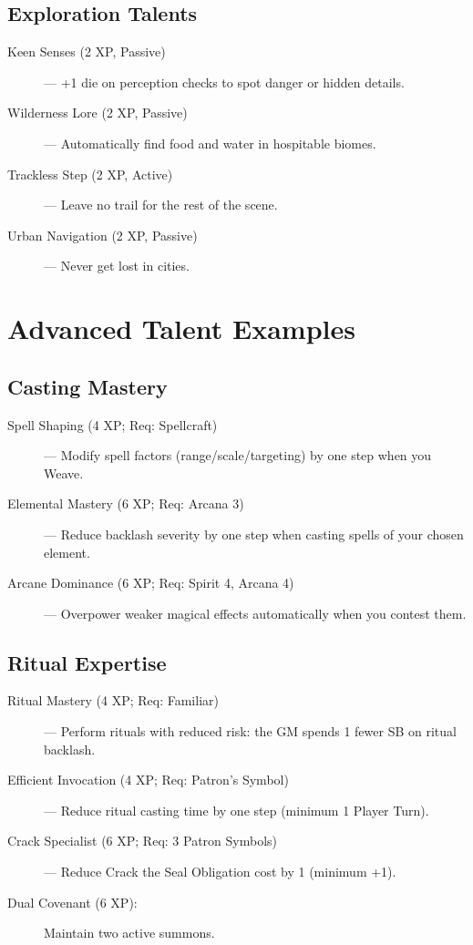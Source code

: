 \documentclass[11pt,twoside,openany]{book}
\begin{document}
\subsection*{Exploration Talents}

\begin{description}
\item[Keen Senses (2 XP, Passive)] --- +1 die on perception checks to spot danger or hidden details.
\item[Wilderness Lore (2 XP, Passive)] --- Automatically find food and water in hospitable biomes.
\item[Trackless Step (2 XP, Active)] --- Leave no trail for the rest of the scene.
\item[Urban Navigation (2 XP, Passive)] --- Never get lost in cities.
\end{description}

\section*{Advanced Talent Examples} 

\subsection*{Casting Mastery}

\begin{description}
\item[Spell Shaping (4 XP; Req: Spellcraft)] --- Modify spell factors (range/scale/targeting) by one step when you Weave.
\item[Elemental Mastery (6 XP; Req: Arcana 3)] --- Reduce backlash severity by one step when casting spells of your chosen element.
\item[Arcane Dominance (6 XP; Req: Spirit 4, Arcana 4)] --- Overpower weaker magical effects automatically when you contest them.
\end{description}

\subsection*{Ritual Expertise}

\begin{description}
\item[Ritual Mastery (4 XP; Req: Familiar)] --- Perform rituals with reduced risk: the GM spends 1 fewer SB on ritual backlash.
\item[Efficient Invocation (4 XP; Req: Patron's Symbol)] --- Reduce ritual casting time by one step (minimum 1 Player Turn).
\item[Crack Specialist (6 XP; Req: 3 Patron Symbols)] --- Reduce Crack the Seal Obligation cost by 1 (minimum +1).
\item[Dual Covenant (6 XP):] Maintain two active summons.
\end{description}
\end{document}
